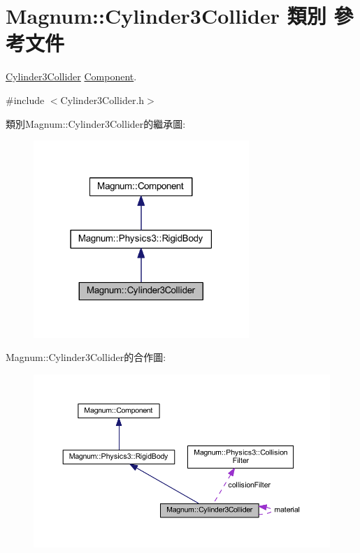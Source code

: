 \hypertarget{class_magnum_1_1_cylinder3_collider}{}\section{Magnum\+:\+:Cylinder3\+Collider 類別 參考文件}
\label{class_magnum_1_1_cylinder3_collider}


\hyperlink{class_magnum_1_1_cylinder3_collider}{Cylinder3\+Collider} \hyperlink{class_magnum_1_1_component}{Component}.  




{\ttfamily \#include $<$Cylinder3\+Collider.\+h$>$}



類別\+Magnum\+:\+:Cylinder3\+Collider的繼承圖\+:\nopagebreak
\begin{figure}[H]
\begin{center}
\leavevmode
\includegraphics[width=231pt]{class_magnum_1_1_cylinder3_collider__inherit__graph}
\end{center}
\end{figure}


Magnum\+:\+:Cylinder3\+Collider的合作圖\+:\nopagebreak
\begin{figure}[H]
\begin{center}
\leavevmode
\includegraphics[width=350pt]{class_magnum_1_1_cylinder3_collider__coll__graph}
\end{center}
\end{figure}
